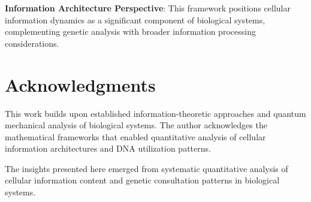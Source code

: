 \documentclass[12pt,a4paper]{article}
\begin{document}
\textbf{Information Architecture Perspective}: This framework positions cellular information dynamics as a significant component of biological systems, complementing genetic analysis with broader information processing considerations.

\section*{Acknowledgments}

This work builds upon established information-theoretic approaches and quantum mechanical analysis of biological systems. The author acknowledges the mathematical frameworks that enabled quantitative analysis of cellular information architectures and DNA utilization patterns.

The insights presented here emerged from systematic quantitative analysis of cellular information content and genetic consultation patterns in biological systems.
\end{document}
